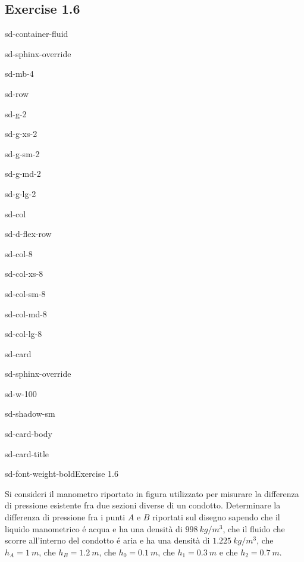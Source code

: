 \documentclass[letterpaper,10pt,italian]{jupyterBook}
\begin{document}
\subsection{Exercise 1.6}
\label{\detokenize{polimi/fluidmechanics-ita/template/capitoli/01_statica/0206in:exercise-1-6}}\label{\detokenize{polimi/fluidmechanics-ita/template/capitoli/01_statica/0206in:fluid-mechanics-statics-ex-06}}\label{\detokenize{polimi/fluidmechanics-ita/template/capitoli/01_statica/0206in::doc}}
\begin{sphinxuseclass}{sd-container-fluid}
\begin{sphinxuseclass}{sd-sphinx-override}
\begin{sphinxuseclass}{sd-mb-4}
\begin{sphinxuseclass}{sd-row}
\begin{sphinxuseclass}{sd-g-2}
\begin{sphinxuseclass}{sd-g-xs-2}
\begin{sphinxuseclass}{sd-g-sm-2}
\begin{sphinxuseclass}{sd-g-md-2}
\begin{sphinxuseclass}{sd-g-lg-2}
\begin{sphinxuseclass}{sd-col}
\begin{sphinxuseclass}{sd-d-flex-row}
\begin{sphinxuseclass}{sd-col-8}
\begin{sphinxuseclass}{sd-col-xs-8}
\begin{sphinxuseclass}{sd-col-sm-8}
\begin{sphinxuseclass}{sd-col-md-8}
\begin{sphinxuseclass}{sd-col-lg-8}
\begin{sphinxuseclass}{sd-card}
\begin{sphinxuseclass}{sd-sphinx-override}
\begin{sphinxuseclass}{sd-w-100}
\begin{sphinxuseclass}{sd-shadow-sm}
\begin{sphinxuseclass}{sd-card-body}
\begin{sphinxuseclass}{sd-card-title}
\begin{sphinxuseclass}{sd-font-weight-bold}Exercise 1.6
\end{sphinxuseclass}
\end{sphinxuseclass}
\sphinxAtStartPar
Si consideri il manometro riportato in figura utilizzato per misurare la
differenza di pressione esistente fra due sezioni diverse di un condotto.
Determinare la differenza di pressione fra i punti \(A\) e \(B\) riportati
sul disegno sapendo che il liquido manometrico é acqua e ha
una densità di \(998\ kg/m^3\), che il fluido che scorre all’interno
del condotto é aria e ha una densità di \(1.225\ kg/m^3\),
che \(h_A = 1\ m\), che \(h_B = 1.2\ m\), che \(h_0= 0.1\ m\),
che \(h_1 = 0.3\ m\) e che \(h_2 = 0.7\ m\).


\end{sphinxuseclass}
\end{sphinxuseclass}
\end{sphinxuseclass}
\end{sphinxuseclass}
\end{sphinxuseclass}
\end{sphinxuseclass}
\end{sphinxuseclass}
\end{sphinxuseclass}
\end{sphinxuseclass}
\end{sphinxuseclass}
\end{sphinxuseclass}
\end{sphinxuseclass}
\end{sphinxuseclass}
\end{sphinxuseclass}
\end{sphinxuseclass}
\end{sphinxuseclass}
\end{sphinxuseclass}
\end{sphinxuseclass}
\end{sphinxuseclass}
\end{sphinxuseclass}
\end{sphinxuseclass}
\end{document}
